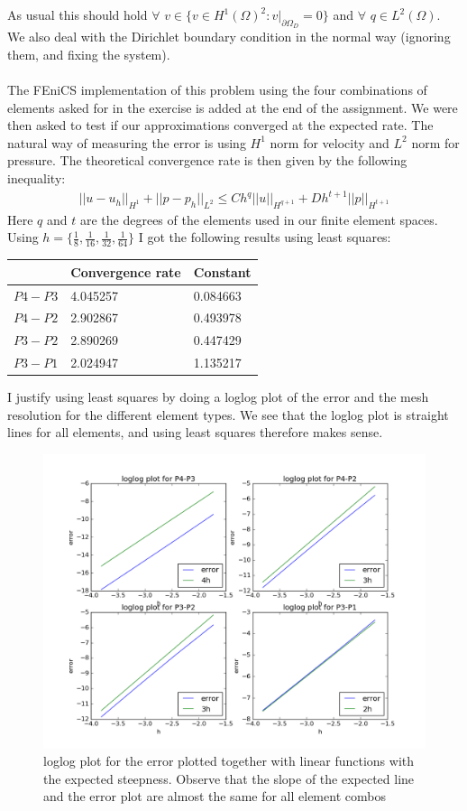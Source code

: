 \documentclass[11pt,a4paper]{report}
\begin{document}
As usual this should hold $\forall$ $v \in \{ v \in H^1(\Omega)^2 : v|_{\partial\Omega_D} =0  \}$ and $\forall$ $q \in L^2(\Omega)$. We also deal with the Dirichlet boundary condition in the normal way (ignoring them, and fixing the system). 
\\
\\
The FEniCS implementation of this problem using the four combinations of elements asked for in the exercise is added at the end of the assignment. We were then asked to test if our approximations converged at the expected rate. The natural way of measuring the error is using $H^1$ norm for velocity and $L^2$ norm for pressure. The theoretical convergence rate is then given by the following inequality:
\begin{align*}
||u-u_h||_{H^1}+||p-p_h||_{L^2} \leq Ch^{q}||u||_{H^{q+1}}+Dh^{t+1}||p||_{H^{t+1}}
\end{align*}
Here $q$ and $t$ are the degrees of the elements used in our finite element spaces. Using $h=\{\frac{1}{8},\frac{1}{16}, \frac{1}{32},\frac{1}{64}\}$ I got the following results using least squares:
\begin{center}
    \begin{tabular}{| l | l | l |}
    \hline
     & Convergence rate & Constant  \\ \hline
    $P4-P3$ & 4.045257 & 0.084663 \\ \hline
    $P4-P2$ & 2.902867 &  0.493978	\\ \hline
    $P3-P2$ & 2.890269 & 0.447429\\ \hline
    $P3-P1$ & 2.024947 &  1.135217	\\ \hline
    \end{tabular}
\end{center}
I justify using least squares by doing a loglog plot of the error and the mesh resolution for the different element types. We see that the loglog plot is straight lines for all elements, and using least squares therefore makes sense.
\begin{figure}
  \includegraphics[width=\linewidth]{element_con.png}
  \caption{loglog plot for the error plotted together with linear functions with the expected steepness. Observe that the slope of the expected line and the error plot are almost the same for all element combos}
  \label{Fig 1}
\end{figure}
\end{document}
